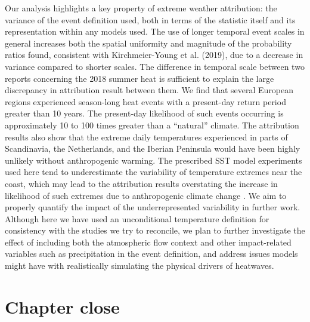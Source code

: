   Our analysis highlights a key property of extreme weather attribution: the variance of the event definition used, both in terms of the statistic itself and its representation within any models used. The use of longer temporal event scales in general increases both the spatial uniformity and magnitude of the probability ratios found, consistent with Kirchmeier-Young et al. (2019), due to a decrease in variance compared to shorter scales. The difference in temporal scale between two reports concerning the 2018 summer heat is sufficient to explain the large discrepancy in attribution result between them. We find that several European regions experienced season-long heat events with a present-day return period greater than 10 years. The present-day likelihood of such events occurring is approximately 10 to 100 times greater than a “natural” climate. The attribution results also show that the extreme daily temperatures experienced in parts of Scandinavia, the Netherlands, and the Iberian Peninsula would have been highly unlikely without anthropogenic warming. The prescribed SST model experiments used here tend to underestimate the variability of temperature extremes near the coast, which may lead to the attribution results overstating the increase in likelihood of such extremes due to anthropogenic climate change \citep{bellprat_towards_2019}. We aim to properly quantify the impact of the underrepresented variability in further work. Although here we have used an unconditional temperature definition for consistency with the studies we try to reconcile, we plan to further investigate the effect of including both the atmospheric flow context and other impact-related variables such as precipitation in the event definition, and address issues models might have with realistically simulating the physical drivers of heatwaves.

\section{Chapter close}
